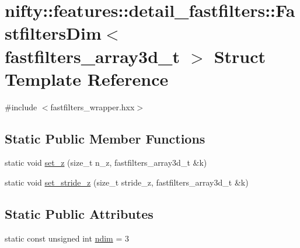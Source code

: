 \hypertarget{structnifty_1_1features_1_1detail__fastfilters_1_1FastfiltersDim_3_01fastfilters__array3d__t_01_4}{}\section{nifty\+:\+:features\+:\+:detail\+\_\+fastfilters\+:\+:Fastfilters\+Dim$<$ fastfilters\+\_\+array3d\+\_\+t $>$ Struct Template Reference}
\label{structnifty_1_1features_1_1detail__fastfilters_1_1FastfiltersDim_3_01fastfilters__array3d__t_01_4}


{\ttfamily \#include $<$fastfilters\+\_\+wrapper.\+hxx$>$}

\subsection*{Static Public Member Functions}
\begin{DoxyCompactItemize}
\item 
static void \hyperlink{structnifty_1_1features_1_1detail__fastfilters_1_1FastfiltersDim_3_01fastfilters__array3d__t_01_4_a6e88b081aa0233e81f3a8c84c3ef53b8}{set\+\_\+z} (size\+\_\+t n\+\_\+z, fastfilters\+\_\+array3d\+\_\+t \&k)
\item 
static void \hyperlink{structnifty_1_1features_1_1detail__fastfilters_1_1FastfiltersDim_3_01fastfilters__array3d__t_01_4_a0698c3079abd3fc3259201d569226a45}{set\+\_\+stride\+\_\+z} (size\+\_\+t stride\+\_\+z, fastfilters\+\_\+array3d\+\_\+t \&k)
\end{DoxyCompactItemize}
\subsection*{Static Public Attributes}
\begin{DoxyCompactItemize}
\item 
static const unsigned int \hyperlink{structnifty_1_1features_1_1detail__fastfilters_1_1FastfiltersDim_3_01fastfilters__array3d__t_01_4_ade1a9611314dfe152d2cab3cab55e473}{ndim} = 3
\end{DoxyCompactItemize}


